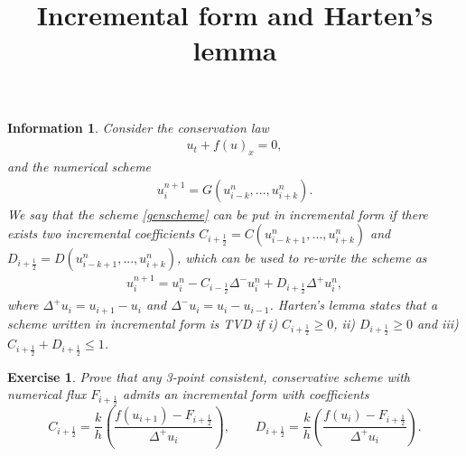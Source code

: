 \documentclass[10pt,letterpaper]{article}
\newcommand{\iph}{{i + \frac{1}{2}}}
\newcommand{\imh}{{i - \frac{1}{2}}}
\theoremstyle{break}
\newtheorem{exercise}{Exercise}
\newtheorem*{information}{Information}
\begin{document}
\title{Incremental form and Harten's lemma}
\date{}

\maketitle




\begin{information}
        Consider the conservation law
        \begin{gather} \label{conlaw}
                u_t+f(u)_x=0,
        \end{gather}%
        and the numerical scheme
        \begin{gather} \label{genscheme}
                u^{n+1}_i = G(u^n_{i-k},...,u^n_{i+k}).
        \end{gather}%
        We say that the scheme \eqref{genscheme} can be put in \textit{incremental form} if there exists two incremental coefficients $C_\iph = C(u_{i-k+1}^n,...,u_{i+k}^n)$ and $D_\iph = D(u_{i-k+1}^n,...,u_{i+k}^n)$, which can be used to re-write the scheme as
        \begin{gather} \label{incform}
                u^{n+1}_i = u_i^n - C_\imh \Delta^-u^n_i + D_\iph \Delta^+u^n_i,
        \end{gather}%
        where $\Delta^+u_i = u_{i+1} - u_i$ and $\Delta^-u_i = u_i- u_{i-1}$. Harten's lemma states that a scheme written in incremental form is TVD if i) $C_\iph \geq 0$, ii) $D_\iph \geq 0$ and iii) $C_\iph + D_\iph \leq 1$.
\end{information}









\begin{exercise}
        Prove that any 3-point consistent, conservative scheme with numerical flux $F_\iph$ admits an incremental form with coefficients
        \[
        C_\iph = \frac{k}{h} \left(\frac{f(u_{i+1}) - F_\iph}{\Delta^+u_i} \right), \qquad D_\iph = \frac{k}{h} \left(\frac{f(u_{i}) - F_\iph}{\Delta^+u_i}\right).
        \]
\end{exercise}
\end{document}
